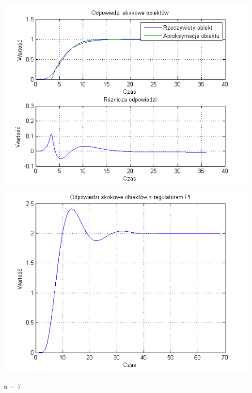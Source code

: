 \documentclass[10pt,a4paper]{article}
\begin{document}
\begin{center}
\includegraphics[scale=1]{images/jeden/skrypt_111.png}\\
\includegraphics[scale=1]{images/jeden/skrypt_112.png}\\
\end{center}
\newpage
n = 7
\end{document}
